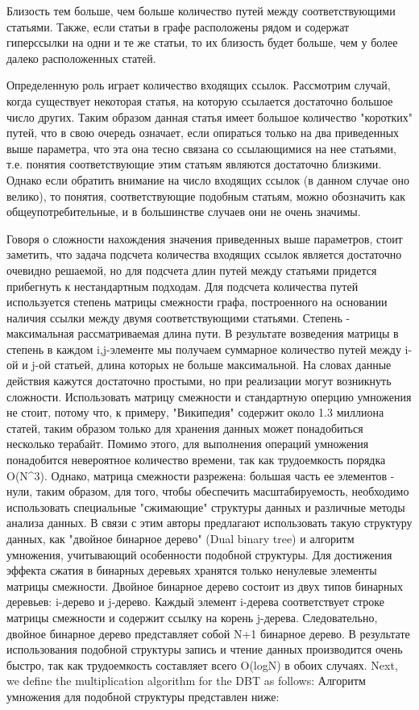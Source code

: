 Близость тем больше, чем больше количество путей между соответствующими
статьями. Также, если статьи в графе расположены рядом и содержат гиперссылки на
одни и те же статьи, то их близость будет больше, чем у более далеко расположенных
статей.

Определенную роль играет количество входящих ссылок. Рассмотрим случай, когда существует 
некоторая статья, на которую ссылается достаточно большое число других. Таким образом
данная статья имеет большое количество "коротких" путей, что в свою очередь означает,
если опираться только на два приведенных выше параметра, что эта она тесно связана
со ссылающимися на нее статьями, т.е. понятия соответствующие этим статьям являются достаточно
близкими. Однако если обратить внимание на число входящих ссылок (в данном случае
оно велико), то понятия, соответствующие подобным статьям, можно обозначить как общеупотребительные,
и в большинстве случаев они не очень значимы. 

Говоря о сложности нахождения значения приведенных выше параметров, стоит заметить, что
задача подсчета количества входящих ссылок является достаточно очевидно решаемой, но для 
подсчета длин путей между статьями придется прибегнуть к нестандартным подходам. 
Для подсчета количества путей используется степень матрицы смежности графа, 
построенного на основании наличия ссылки между двумя соответствующими статьями. 
Степень - максимальная рассматриваемая длина пути. В результате возведения матрицы
в степень в каждом i,j-элементе мы получаем суммарное количество путей между i-ой
и j-ой статьей,  длина которых не больше максимальной. 
На словах данные действия кажутся достаточно простыми, но при реализации могут возникнуть 
сложности. Использовать матрицу смежности и стандартную оперцию умножения не стоит, потому что,
к примеру, "Википедия" содержит около 1.3 миллиона статей, таким образом только для хранения
данных может понадобиться несколько терабайт. Помимо этого, для выполнения операций умножения
понадобится невероятное количество времени, так как трудоемкость порядка O(N^3).
Однако, матрица смежности разрежена: большая часть ее элементов - нули, таким образом,
для того, чтобы обеспечить масштабируемость, необходимо использовать специальные "сжимающие"
структуры данных и различные методы анализа данных. В связи с этим авторы предлагают использовать
такую структуру данных, как "двойное бинарное дерево" (Dual binary tree) и алгоритм умножения, 
учитывающий особенности подобной структуры.
Для достижения эффекта сжатия в бинарных деревьях хранятся только ненулевые элементы матрицы 
смежности. Двойное бинарное дерево состоит из двух типов бинарных деревьев: i-дерево и j-дерево.
Каждый элемент i-дерева соответствует строке матрицы смежности и содержит ссылку на корень j-дерева.
Следовательно, двойное бинарное дерево представляет собой N+1 бинарное дерево. В результате 
использования подобной структуры запись и чтение данных производится очень быстро, так как
трудоемкость составляет всего O(logN) в обоих случаях.
Next, we define the multiplication algorithm for the DBT as follows:
Алгоритм умножения для подобной структуры представлен ниже:

